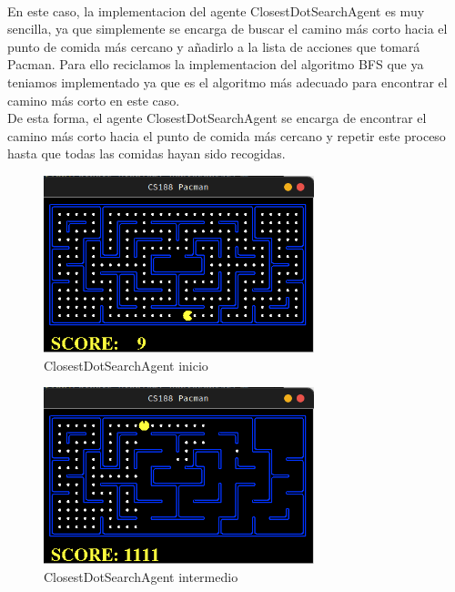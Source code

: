 \documentclass{report}
\begin{document}
          \paragraph*{}{
            En este caso, la implementacion del agente ClosestDotSearchAgent es muy sencilla, ya que simplemente se encarga de buscar el camino más corto hacia el punto de comida más cercano y añadirlo a la lista de acciones que tomará Pacman.
            Para ello reciclamos la implementacion del algoritmo BFS que ya teniamos implementado ya que es el algoritmo más adecuado para encontrar el camino más corto en este caso.\\

            De esta forma, el agente ClosestDotSearchAgent se encarga de encontrar el camino más corto hacia el punto de comida más cercano y repetir este proceso hasta que todas las comidas hayan sido recogidas.\\
          }
          \begin{figure}[H]
            \centering
            \includegraphics[width=0.7\textwidth]{.img/2.8.1.png}
            \caption{ClosestDotSearchAgent inicio}
          \end{figure}
          \begin{figure}[H]
            \centering
            \includegraphics[width=0.7\textwidth]{.img/2.8.2.png}
            \caption{ClosestDotSearchAgent intermedio}
          \end{figure}
\end{document}
